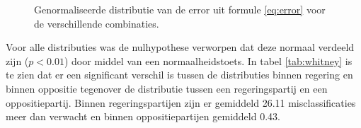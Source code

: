 \begin{figure}[H]
    \quad
    \caption{Genormaliseerde distributie van de error uit formule \ref{eq:error} voor de verschillende combinaties.}%
    \label{fig:distributies}%
\end{figure}
Voor alle distributies was de nulhypothese verworpen dat deze normaal verdeeld zijn ($p < 0.01$) door middel van een normaalheidstoets. In tabel \ref{tab:whitney} is te zien dat er een significant verschil is tussen de distributies binnen regering en binnen oppositie tegenover de distributie tussen een regeringspartij en een oppositiepartij. Binnen regeringspartijen zijn er gemiddeld 26.11 misclassificaties meer dan verwacht en binnen oppositiepartijen gemiddeld 0.43.

